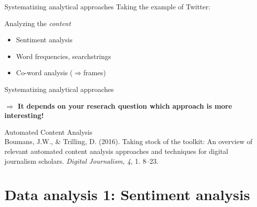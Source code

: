 \documentclass{beamer}
\begin{document}
\begin{frame}{Systematizing analytical approaches}
Taking the example of Twitter:
\begin{block}{Analyzing the \emph{content}}
\begin{itemize}
\item Sentiment analysis
\item Word frequencies, searchstrings
\item Co-word analysis ($\Rightarrow$frames)
\end{itemize}
\end{block}
\end{frame}

\begin{frame}{Systematizing analytical approaches}

{\textbf{$\Rightarrow$ It depends on your reserach question which approach is more interesting!}}
\end{frame}






\begin{frame}{Automated Content Analysis}
	\\
	\tiny
	Boumans, J.W., \& Trilling, D. (2016). Taking stock of the toolkit: An overview of relevant automated content analysis approaches and techniques for digital journalism scholars. \emph{Digital Journalism, 4}, 1. 8--23.
\end{frame}






\section[Sentiment analysis]{Data analysis 1: Sentiment analysis}
\end{document}
